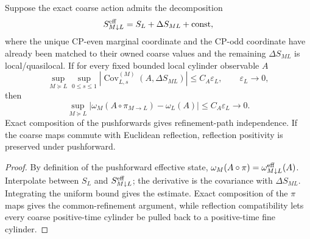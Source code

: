 \documentclass[12pt,a4paper]{article}
\begin{document}
\begin{theorem}
\label{p12:thm:effective-action-stability-qft4}
Suppose the exact coarse action admits the decomposition
\[
 S^{\rm eff}_{M\downarrow L}
 =S_L+\Delta S_{ML}+\text{const},
\]
where the unique CP-even marginal coordinate and the CP-odd coordinate have
already been matched to their owned coarse values and the remaining
$\Delta S_{ML}$ is local/quasilocal.  If for every fixed bounded local
cylinder observable $A$
\[
 \sup_{M\succeq L}\sup_{0\le s\le1}
 \left|\operatorname{Cov}^{(M)}_{L,s}(A,\Delta S_{ML})\right|
 \le C_A\varepsilon_L,
 \qquad \varepsilon_L\to0,
\]
then
\[
 \boxed{
 \sup_{M\succeq L}
 |\omega_M(A\circ\pi_{M\to L})-\omega_L(A)|
 \le C_A\varepsilon_L\to0.}
\]
Exact composition of the pushforwards gives refinement-path independence.
If the coarse maps commute with Euclidean reflection, reflection positivity
is preserved under pushforward.
\end{theorem}
\begin{proof}
By definition of the pushforward effective state,
$\omega_M(A\circ\pi)=\omega^{\rm eff}_{M\downarrow L}(A)$.
Interpolate between $S_L$ and $S^{\rm eff}_{M\downarrow L}$; the derivative
is the covariance with $\Delta S_{ML}$.  Integrating the uniform bound gives
the estimate.  Exact composition of the $\pi$ maps gives the common-refinement
argument, while reflection compatibility lets every coarse positive-time
cylinder be pulled back to a positive-time fine cylinder.
\end{proof}
\end{document}
